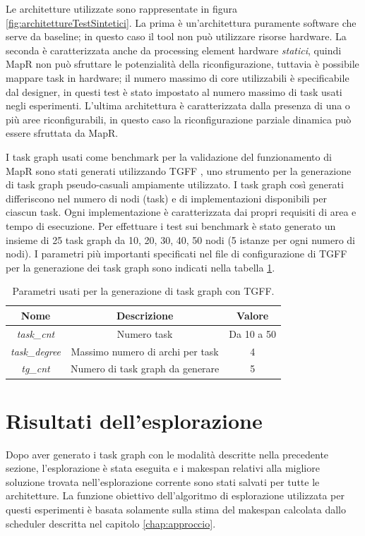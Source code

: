 Le architetture utilizzate
sono rappresentate in figura \ref{fig:architettureTestSintetici}. La prima \`e un'architettura puramente
software che serve da baseline; in questo caso il tool non pu\`o utilizzare risorse hardware.
La seconda \`e caratterizzata anche da processing element hardware \emph{statici}, quindi MapR non pu\`o
sfruttare le potenzialit\`a della riconfigurazione, tuttavia \`e possibile mappare task in hardware;
il numero massimo di core utilizzabili \`e specificabile dal designer, in questi test
\`e stato impostato al numero massimo di task usati negli esperimenti.
L'ultima architettura \`e caratterizzata dalla presenza di una o pi\`u aree riconfigurabili, in questo
caso la riconfigurazione parziale dinamica pu\`o essere sfruttata da MapR.


I task graph usati come benchmark per la validazione del funzionamento di
\mbox{MapR} sono stati generati utilizzando \ac{TGFF} \cite{tgff}, uno strumento per
la generazione di task graph pseudo-casuali ampiamente utilizzato.
I task graph cos\`i generati differiscono nel numero di nodi (task) e di implementazioni
disponibili per ciascun task. Ogni implementazione \`e caratterizzata dai propri requisiti
di area e tempo di esecuzione. Per effettuare i test sui benchmark \`e stato generato un insieme di 25 task graph da
10, 20, 30, 40, 50 nodi (5 istanze per ogni numero di nodi). I parametri pi\`u importanti specificati
nel file di configurazione di \ac{TGFF} per la generazione dei task graph sono indicati nella tabella
\ref{tab:parametriTGFF}.

\begin{table}[t]
  \begin{center}
  \begin{tabular}{|c|c|c|}
    \hline
    \textbf{Nome} & \textbf{Descrizione} & \textbf{Valore}\\
    \hline
    \emph{task\_cnt} & Numero task & Da 10 a 50\\
    \hline
    \emph{task\_degree} & Massimo numero di archi per task & 4\\
    \hline
    \emph{tg\_cnt} & Numero di task graph da generare & 5\\
    \hline
  \end{tabular}
  \caption{Parametri usati per la generazione di task graph con \acs{TGFF}.}
  \label{tab:parametriTGFF}
\end{center}
\end{table}


\section{Risultati dell'esplorazione}
\label{sec:risultatiEsplorazione}
Dopo aver generato i task graph con le modalit\`a descritte nella precedente
sezione, l'esplorazione \`e stata eseguita e i makespan relativi alla migliore soluzione
trovata nell'esplorazione corrente sono stati salvati per tutte le architetture.
La funzione obiettivo dell'algoritmo di esplorazione utilizzata per questi esperimenti
\`e basata solamente sulla stima del makespan calcolata dallo scheduler descritta nel
capitolo \ref{chap:approccio}.

